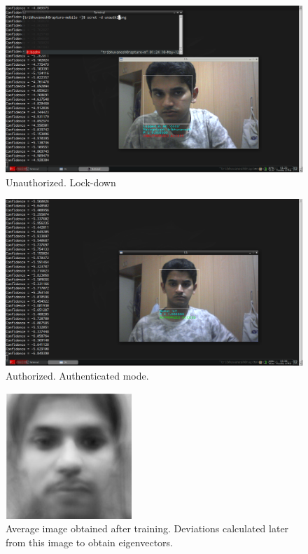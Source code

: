 \documentclass[12pt]{article}			%
\begin{document}
\begin{figure}
	\caption{Unauthorized. Lock-down}
	\centering
\includegraphics[scale=0.3]{img/unauth2.png}
\end{figure}

\begin{figure}
	\caption{Authorized. Authenticated mode.}
	\centering
\includegraphics[scale=0.3]{img/hard2.png}
\end{figure}

\begin{figure}
	\caption{Average image obtained after training. Deviations calculated later from this image to obtain eigenvectors.}
	\centering
\includegraphics[scale=1]{img/avg_image.jpeg}
\end{figure}
\end{document}
